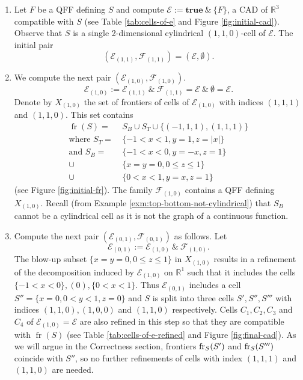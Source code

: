 \documentclass[
]{book}
\theoremstyle{definition}
\theoremstyle{definition}
\theoremstyle{definition}
\theoremstyle{definition}
\theoremstyle{remark}
\begin{document}
\begin{enumerate}
\def\labelenumi{\arabic{enumi}.}
\item
  Let \(F\) be a QFF defining \(S\) and compute \(\mathcal{E} := \mathbf{true}\ \&\ \{F\}\), a CAD of \(\mathbb{R}^3\) compatible with \(S\) (see Table \ref{tab:cells-of-e} and Figure \ref{fig:initial-cad}). Observe that \(S\) is a single 2-dimensional cylindrical \((1,1,0)\)-cell of \(\mathcal{E}\).
  The initial pair \[
  (\mathcal{E}_{(1,1)}, \mathcal{F}_{(1,1)}) = (\mathcal{E}, \emptyset).
  \]
\item
  We compute the next pair \((\mathcal{E}_{(1,0)}, \mathcal{F}_{(1,0)})\).
  \[\mathcal{E}_{(1,0)} := \mathcal{E}_{(1,1)}\ \&\ \mathcal{F}_{(1,1)} = \mathcal{E}\ \&\ \emptyset = \mathcal{E}.
  \]
  Denote by \(X_{(1,0)}\) the set of frontiers of cells of \(\mathcal{E}_{(1,0)}\) with indices \((1,1,1)\) and \((1,1,0)\).
  This set contains
  \begin{align*}
  {\operatorname{fr} \left( S \right)} = &\ S_B \cup S_T \cup \{ (-1,1,1), (1,1,1) \}\\
  \text{where }
  S_T = &\ \{ -1 < x < 1, y = 1, z = \vert x \vert \} \\
  \text{and }
  S_B = &\ \{ -1 < x < 0, y = -x, z = 1 \} \\
  \cup &\ \{ x = y = 0, 0 \le z \le 1 \} \\
  \cup &\ \{ 0 < x < 1, y = x, z = 1 \}
  \end{align*}
  (see Figure \ref{fig:initial-fr}). The family \(\mathcal{F}_{(1,0)}\) contains a QFF defining \(X_{(1,0)}\).
  Recall (from Example \ref{exm:top-bottom-not-cylindrical}) that \(S_B\) cannot be a cylindrical cell as it is not the graph of a continuous function.
\item
  Compute the next pair \((\mathcal{E}_{(0,1)}, \mathcal{F}_{(0,1)})\) as follows. Let
  \[
  \mathcal{E}_{(0,1)} := \mathcal{E}_{(1,0)}\ \&\ \mathcal{F}_{(1,0)}.
  \]
  The blow-up subset \(\{ x = y = 0, 0 \le z \le 1 \}\) in \(X_{(1,0)}\) results in a refinement of the decomposition induced by \(\mathcal{E}_{(1,0)}\) on \(\mathbb{R}^1\) such that it includes the cells \(\{-1 < x < 0\}, (0), \{ 0 < x < 1 \}\). Thus \(\mathcal{E}_{(0,1)}\) includes a cell \(S'' = \{ x = 0, 0 < y < 1, z = 0 \}\) and \(S\) is split into three cells \(S', S'', S'''\) with indices \((1,1,0),(1,0,0)\) and \((1,1,0)\) respectively.
  Cells \(C_1,C_2,C_3\) and \(C_4\) of \(\mathcal{E}_{(1,0)} = \mathcal{E}\) are also refined in this step so that they are compatible with \({\operatorname{fr} \left( S \right)}\) (see Table \ref{tab:cells-of-e-refined} and Figure \ref{fig:final-cad}). As we will argue in the Correctness section, frontiers \({\rm{fr}}_S(S')\) and \({\rm{fr}}_S(S''')\) coincide with \(S''\), so no further refinements of cells with index \((1,1,1)\) and \((1,1,0)\) are needed.

\end{enumerate}
\end{document}
